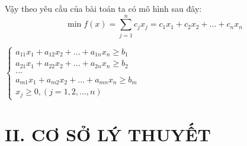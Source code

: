 \documentclass{article}
\begin{document}
Vậy theo yêu cầu của bài toán ta có mô hình sau đây:
\begin{equation*}
    \min{f(x)} =\sum_{j=1}^n c_jx_j = c_1x_1 + c_2x_2 + ... + c_nx_n
\end{equation*}
\begin{center}
    $\begin{cases}
        a_{11}x_1 + a_{12}x_2 +...+ a_{1n}x_n \geq b_1 \\
        a_{21}x_1 + a_{22}x_2 +...+ a_{2n}x_n \geq b_2 \\
        ...\\ 
        a_{m1}x_1 + a_{m2}x_2 +...+ a_{mn}x_n \geq b_m \\
        x_j \geq 0, (j=1,2,...,n)
    \end{cases}$
\end{center}

\newpage
{}
\clearpage
\section*{II. CƠ SỞ LÝ THUYẾT}
\setcounter{section}{1}\setlength{\baselineskip}{15pt}
\setcounter{subsection}{0}
\setcounter{subsubsection}{0}
\setcounter{paragraph}{0}
\end{document}
